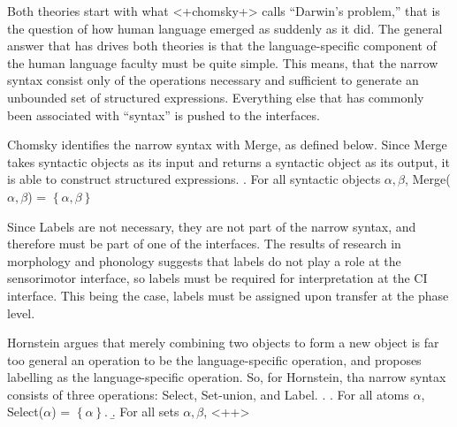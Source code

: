 \documentclass[letterpaper]{article}
\begin{document}
Both theories start with what <+chomsky+> calls ``Darwin's problem,'' that is the question of how human language emerged as suddenly as it did.
The general answer that has drives both theories is that the language-specific component of the human language faculty must be quite simple.
This means, that the narrow syntax consist only of the operations necessary and sufficient to generate an unbounded set of structured expressions.
Everything else that has commonly been associated with ``syntax'' is pushed to the interfaces.

Chomsky identifies the narrow syntax with Merge, as defined below.
Since Merge takes syntactic objects as its input and returns a syntactic object as its output, it is able to construct structured expressions.
\ex. For all syntactic objects $\alpha,\beta$, Merge($\alpha, \beta$) = $\left\{ \alpha, \beta \right\}$

Since Labels are not necessary, they are not part of the narrow syntax, and therefore must be part of one of the interfaces.
The results of research in morphology and phonology suggests that labels do not play a role at the sensorimotor interface, so labels must be required for interpretation at the CI interface.
This being the case, labels must be assigned upon transfer at the phase level.

Hornstein argues that merely combining two objects to form a new object is far too general an operation to be the language-specific operation, and proposes labelling as the language-specific operation.
So, for Hornstein, tha narrow syntax consists of three operations: Select, Set-union, and Label.
\ex.
\a. For all atoms $\alpha$, Select($\alpha$) = $\left\{ \alpha \right\}$.
\b. For all sets $\alpha, \beta$, $$<++>
\end{document}
